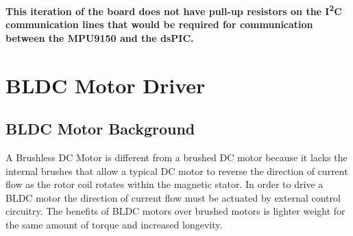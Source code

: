 \documentclass{article}
\begin{document}
\textbf{This iteration of the board does not have pull-up resistors on the I\textsuperscript{2}C communication lines that would be required for communication between the MPU9150 and the dsPIC.}


\section{BLDC Motor Driver}
\subsection{BLDC Motor Background}
A Brushless DC Motor is different from a brushed DC motor because it lacks the internal brushes that allow a typical DC motor to reverse the direction of current flow as the rotor coil rotates within the magnetic stator. In order to drive a BLDC motor the direction of current flow must be actuated by external control circuitry. The benefits of BLDC motors over brushed motors is lighter weight for the same amount of torque and increased longevity.
\end{document}
